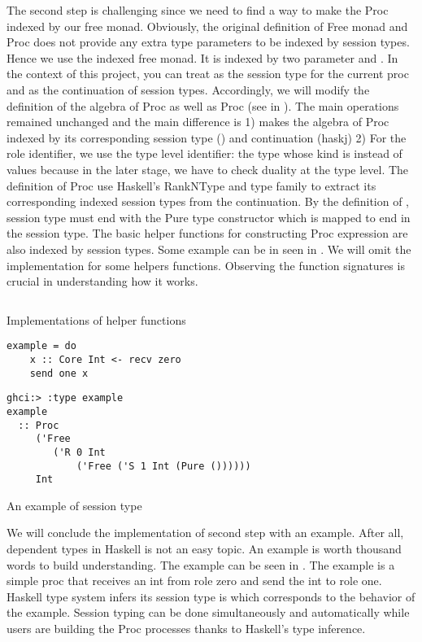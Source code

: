 The second step is challenging since we need to find a way to make the Proc indexed by our free monad. Obviously, the original definition of Free monad and Proc does not provide any extra type parameters to be indexed by session types. Hence we use the indexed free monad. It is indexed by two parameter  and . In the context of this project, you can treat  as the session type for the current proc  and  as the continuation of session types. Accordingly, we will modify the definition of the algebra of Proc as well as Proc (see in ). The main operations remained unchanged and the main difference is 1) makes the algebra of Proc indexed by its corresponding session type () and continuation (hask{j}) 2) For the role identifier, we use the type level identifier: the type whose kind is  instead of values because in the later stage, we have to check duality at the type level. The definition of Proc use Haskell's RankNType and type family \hask{>*>} to extract its corresponding indexed session types  from the continuation. By the definition of \hask{>*>}, session type  must end with the Pure type constructor which is mapped to end in the session type. The basic helper functions for constructing Proc expression are also indexed by session types. Some example can be in seen in . We will omit the implementation for some helpers functions. Observing the function signatures is crucial in understanding how it works.
\begin{listing}[ht]
    \inputminted{Haskell}{impl/typehelper.hs}
    \caption{Implementations of helper functions}
    \label{impl:code:typehelper}
\end{listing}

\begin{listing}[ht]
\begin{verbatim}
example = do
    x :: Core Int <- recv zero 
    send one x
\end{verbatim}
\begin{verbatim}
ghci:> :type example
example
  :: Proc
     ('Free
        ('R 0 Int
            ('Free ('S 1 Int (Pure ())))))
     Int
\end{verbatim}
    \caption{An example of session type}
    \label{impl:code:typeexample}
\end{listing}

We will conclude the implementation of second step with an example. After all, dependent types in Haskell is not an easy topic. An example is worth thousand words to build understanding. The example can be seen in . The example is a simple proc that receives an int from role zero and send the int to role one. Haskell type system infers its session type is  which corresponds to the behavior of the example. Session typing can be done simultaneously and automatically while users are building the Proc processes thanks to Haskell's type inference.

